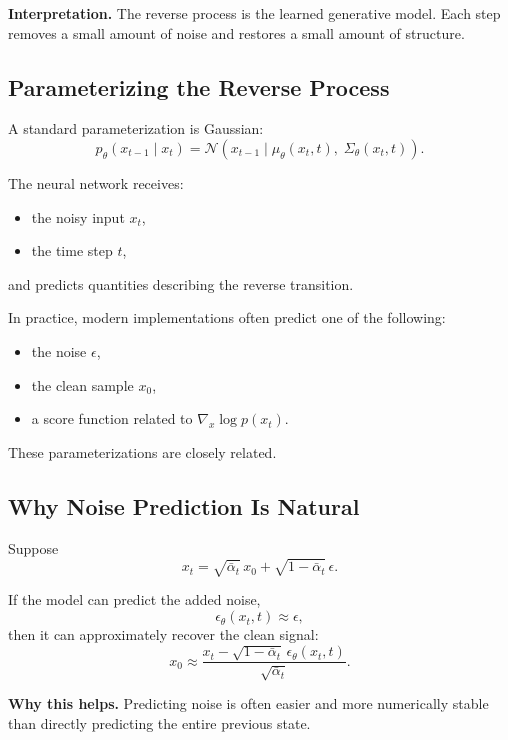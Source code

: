 \medskip

\noindent
\textbf{Interpretation.}
The reverse process is the learned generative model. Each step removes a small amount of noise and restores a small amount of structure.

\subsection{Parameterizing the Reverse Process}

A standard parameterization is Gaussian:
\[
p_\theta(x_{t-1}\mid x_t)
=
\mathcal{N}\!\left(
x_{t-1} \mid \mu_\theta(x_t,t),\; \Sigma_\theta(x_t,t)
\right).
\]

\medskip

\noindent
The neural network receives:
\begin{itemize}
    \item the noisy input $x_t$,
    \item the time step $t$,
\end{itemize}
and predicts quantities describing the reverse transition.

\medskip

\noindent
In practice, modern implementations often predict one of the following:
\begin{itemize}
    \item the noise $\epsilon$,
    \item the clean sample $x_0$,
    \item a score function related to $\nabla_x \log p(x_t)$.
\end{itemize}

These parameterizations are closely related.

\subsection{Why Noise Prediction Is Natural}

Suppose
\[
x_t = \sqrt{\bar{\alpha}_t}\,x_0 + \sqrt{1-\bar{\alpha}_t}\,\epsilon.
\]

If the model can predict the added noise,
\[
\epsilon_\theta(x_t,t) \approx \epsilon,
\]
then it can approximately recover the clean signal:
\[
x_0 \approx
\frac{x_t - \sqrt{1-\bar{\alpha}_t}\,\epsilon_\theta(x_t,t)}
{\sqrt{\bar{\alpha}_t}}.
\]

\medskip

\noindent
\textbf{Why this helps.}
Predicting noise is often easier and more numerically stable than directly predicting the entire previous state.

